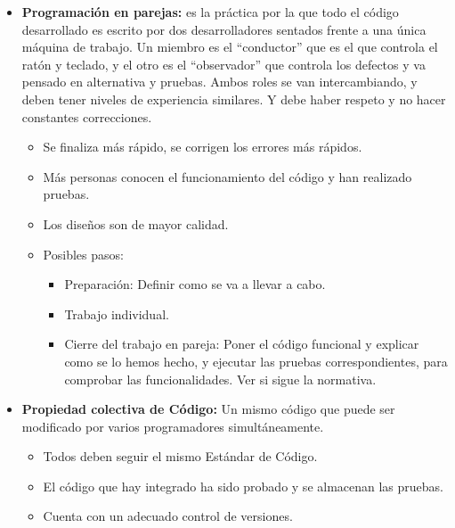 \documentclass[12pt, twoside, openright]{report} %
\begin{document}
\begin{itemize}
\item \textbf{Programación en parejas:} es la práctica por la que todo el
  código desarrollado es escrito por dos desarrolladores sentados frente
  a una única máquina de trabajo. Un miembro es el ``conductor'' que es
  el que controla el ratón y teclado, y el otro es el ``observador'' que
  controla los defectos y va pensado en alternativa y pruebas. Ambos
  roles se van intercambiando, y deben tener niveles de experiencia
  similares. Y debe haber respeto y no hacer constantes correcciones.
  

  \begin{itemize}
  \item Se finaliza más rápido, se corrigen los errores más rápidos.
    
  \item Más personas conocen el funcionamiento del código y han realizado
    pruebas.
    
  \item Los diseños son de mayor calidad.
    
  \item Posibles pasos:
    

    \begin{itemize}
    \item Preparación: Definir como se va a llevar a cabo.
      
    \item Trabajo individual.
      
    \item Cierre del trabajo en pareja: Poner el código funcional y explicar
      como se lo hemos hecho, y ejecutar las pruebas correspondientes,
      para comprobar las funcionalidades. Ver si sigue la normativa.
      
    \end{itemize}
  \end{itemize}
\item \textbf{Propiedad colectiva de Código:} Un mismo código que puede ser
  modificado por varios programadores simultáneamente.
  

  \begin{itemize}
  \item Todos deben seguir el mismo Estándar de Código.
    
  \item El código que hay integrado ha sido probado y se almacenan las
    pruebas.
    
  \item Cuenta con un adecuado control de versiones.
    

\end{itemize}
\end{itemize}
\end{document}
